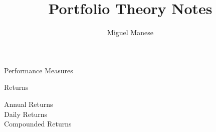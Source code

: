 \documentclass{article}
\title{Portfolio Theory Notes}
\author{Miguel Manese}
\date{}
\begin{document}
\maketitle

\begin{section}{Performance Measures}
\begin{subsection}{Returns}
\begin{description}
\item[Annual Returns] 
\item[Daily Returns] 
\item[Compounded Returns]
\end{description}
\end{subsection}

\end{section}
\end{document}

